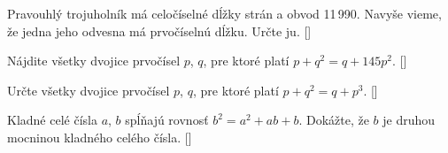 {Pravouhlý trojuholník má celočíselné dĺžky strán a obvod 11\,990. Navyše vieme, že jedna
jeho odvesna má prvočíselnú dĺžku. Určte ju.
[]

Nájdite všetky dvojice prvočísel $p$, $q$, pre ktoré platí
$p+q^{2}=q+145p^{2}$.
[]

Určte všetky dvojice prvočísel $p$, $q$, pre ktoré platí
$p+q^2=q+p^3$.
[]


Kladné celé čísla $a$, $b$ spĺňajú rovnosť $b^2 = a^2 + ab + b$.
Dokážte, že $b$ je druhou mocninou kladného celého čísla.
[]

}

